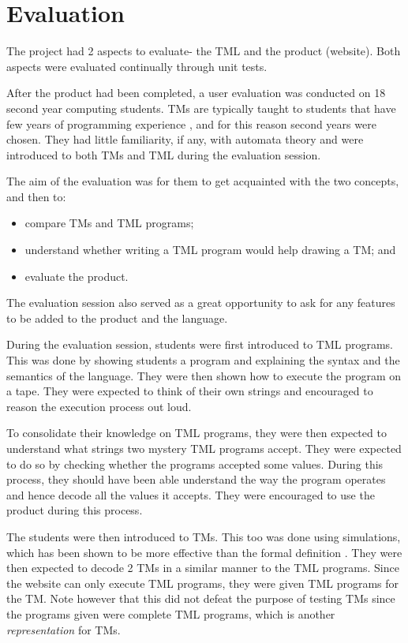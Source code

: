 \chapter{Evaluation} 

The project had 2 aspects to evaluate- the TML and the product (website). Both aspects were evaluated continually through unit tests.

After the product had been completed, a user evaluation was conducted on 18 second year computing students. TMs are typically taught to students that have few years of programming experience \citep{rodger2006jflap}, and for this reason second years were chosen. They had little familiarity, if any, with automata theory and were introduced to both TMs and TML during the evaluation session. 

The aim of the evaluation was for them to get acquainted with the two concepts, and then to:
\begin{itemize}
    \item compare TMs and TML programs;
    \item understand whether writing a TML program would help drawing a TM; and
    \item evaluate the product.
\end{itemize}
The evaluation session also served as a great opportunity to ask for any features to be added to the product and the language.

During the evaluation session, students were first introduced to TML programs. This was done by showing students a program and explaining the syntax and the semantics of the language. They were then shown how to execute the program on a tape. They were expected to think of their own strings and encouraged to reason the execution process out loud.

To consolidate their knowledge on TML programs, they were then expected to understand what strings two mystery TML programs accept. They were expected to do so by checking whether the programs accepted some values. During this process, they should have been able understand the way the program operates and hence decode all the values it accepts. They were encouraged to use the product during this process. 

The students were then introduced to TMs. This too was done using simulations, which has been shown to be more effective than the formal definition \citep{rodger2009increasing}. They were then expected to decode 2 TMs in a similar manner to the TML programs. Since the website can only execute TML programs, they were given TML programs for the TM. Note however that this did not defeat the purpose of testing TMs since the programs given were complete TML programs, which is another \textit{representation} for TMs.

